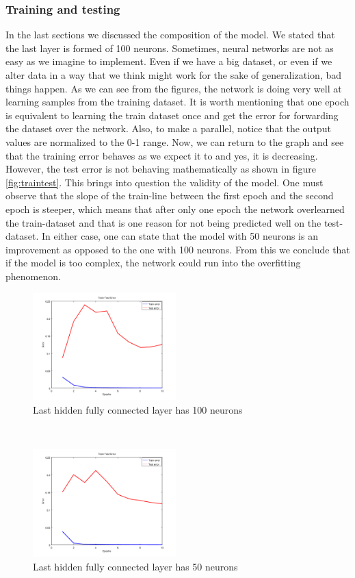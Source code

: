 \subsubsection{Training and testing}
In the last sections we discussed the composition of the model. We stated that the last layer is formed of 100 neurons. Sometimes, neural networks are not as easy as we imagine to implement. Even if we have a big dataset, or even if we alter data in a way that we think might work for the sake of generalization, bad things happen. As we can see from the figures, the network is doing very well at learning samples from the training dataset. It is worth mentioning that one epoch is equivalent to learning the train dataset once and get the error for forwarding the dataset over the network. Also, to make a parallel, notice that the output values are normalized to the 0-1 range. Now, we can return to the graph and see that the training error behaves as we expect it to and yes, it is decreasing. However, the test error is not behaving mathematically as shown in figure \ref{fig:traintest}. This brings into question the validity of the model. One must observe that the slope of the train-line between the first epoch and the second epoch is steeper, which means that after only one epoch the network overlearned the train-dataset and that is one reason for not being predicted well on the test-dataset. In either case, one can state that the model with 50 neurons is an improvement as opposed to the one with 100 neurons. From this we conclude that if the model is too complex, the network could run into the overfitting phenomenon.
\begin{figure}[h]
	\begin{center}
		\includegraphics[width=209px,height=157px]{src/img/system-design/train-test-100}
		\caption{Last hidden fully connected layer has 100 neurons} \label{fig:50tt}
    \end{center}
\end{figure}
~\\
\begin{figure}[h]
	\begin{center}
		\includegraphics[width=209px,height=157px]{src/img/system-design/train-test-50}
		\caption{Last hidden fully connected layer has 50 neurons} \label{fig:100tt}
    \end{center}
\end{figure}
\newpage

